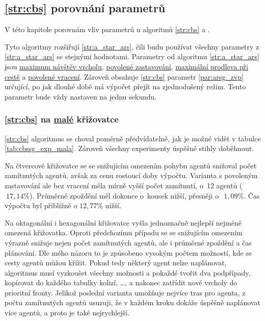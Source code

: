 \subsection{\ref{str:cbs} porovnání parametrů}\label{subsec:cbs_porovnani_parametru}

V této kapitole porovnám vliv parametrů u algoritmů \ref{str:cbs} a .

Tyto algoritmy rozšiřují \ref{str:a_star_ars},
čili budu používat všechny parametry z \ref{str:a_star_ars} se stejnými hodnotami.
Parametry od algoritmu \ref{str:a_star_ars} jsou \hyperref[par:ars_mnv]{maximum návštěv vrcholu},
\hyperref[par:ars_pz]{povolené zastavování}, \hyperref[par:ars_mpc]{maximální prodleva při cestě} a
\hyperref[par:ars_pv]{povolené vracení}.
Zároveň obsahuje \ref{str:cbs} parametr \ref{par:arsg_zvp} určující,
po jak dlouhé době má výpočet přejít na zjednodušený režim.
Tento parametr bude vždy nastaven na jednu sekundu.

\subsubsection{\ref{str:cbs} na \hyperref[par:data_mala]{malé} křižovatce}
\label{subsubsec:exp_cbssg_mala_krizovatka}

\ref{str:cbs} algoritmus se choval poměrně předvídatelně, jak je možné vidět v tabulce \ref{tab:cbssg_exp_mala}.
Zároveň všechny experimenty úspěšně stihly doběhnout.

Na čtvercové křižovatce se se snižujícím omezením pohybu agentů snižoval počet zamítnutých agentů,
avšak za cenu rostoucí doby výpočtu.
Varianta s povoleným zastavování ale bez vracení měla mírně vyšší počet zamítnutí, o~12 agentů ($~17,14\%$).
Průměrné zpoždění měl dokonce o~kousek nižší, přesněji o~$~1,09\%$.
Čas výpočtu byl přibližně o $12,77\%$ nižší.

Na oktagonální i hexagonální křižovatce vyšla jednoznačně nejlepší nejméně omezená křižovatka.
Oproti předchozímu případu se se snižujícím omezením výrazně snižuje nejen počet zamítnutých agentů,
ale i průměrné zpoždění a čas plánování.
Dle mého názoru to je způsobeno vysokým počtem možností, kde se cesty agentů můžou křížit.
Pokud tedy některý agent nelze naplánovat, algoritmus musí vyzkoušet všechny možnosti
a pokaždé tvořit dva podpřípady, kopírovat do každého tabulky kolizí, \dots,
a nakonec zatřídit nové vrcholy do prioritní fronty.
Jelikož poslední varianta umožňuje nejvíce tras pro agenta, z počtu zamítnutých agentů usuzuji,
že v každém kroku dokáže úspěšně naplánovat více agentů, a proto je také nejrychlejší.

